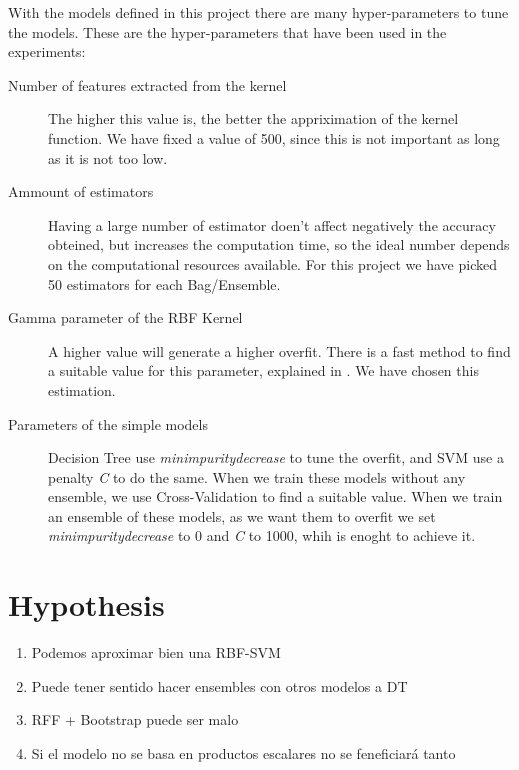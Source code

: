 \begin{pre-delivery}
  With the models defined in this project there are many hyper-parameters to
  tune the models. These are the hyper-parameters that have been used in the
  experiments:
  \begin{description}
    \item[Number of features extracted from the kernel] The higher this value
    is, the better the appriximation of the kernel function. We have fixed a
    value of 500, since this is not important as long as it is not too low.
    \item[Ammount of estimators] Having a large number of estimator doen't
    affect negatively the accuracy obteined, but increases the computation
    time, so the ideal number depends on the computational resources
    available. For this project we have picked 50 estimators for each Bag/Ensemble.
    \item[Gamma parameter of the RBF Kernel] A higher value will generate a
    higher overfit. There is a fast method to find a suitable value for this
    parameter, explained in
    \cite{caputo2002appearance}
    . We have chosen this estimation.
    \item[Parameters of the simple models] Decision Tree use
    \textit{min\tu impurity\tu decrease} to tune the overfit, and SVM use a
    penalty \textit{C} to do the same. When we train these models without
    any ensemble, we use Cross-Validation to find a suitable value. When we
    train an ensemble of these models, as we want them to overfit we set
    \textit{min\tu impurity\tu decrease} to 0 and \textit{C} to 1000, whih
    is enoght to achieve it.
  \end{description}
\end{pre-delivery}
\section{Hypothesis}


\begin{note}
  \begin{enumerate}
    \item Podemos aproximar bien una RBF-SVM
    \item Puede tener sentido hacer ensembles con otros modelos a DT
    \item RFF + Bootstrap puede ser malo
    \item Si el modelo no se basa en productos escalares no se
    feneficiará tanto
  \end{enumerate}
\end{note}


